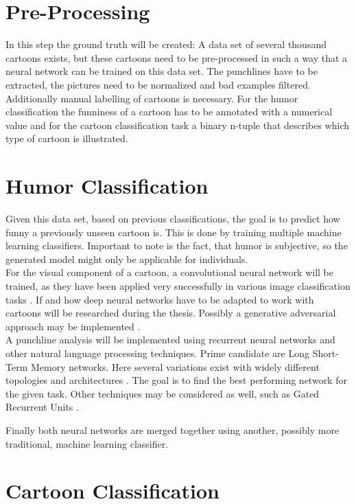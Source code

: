 \documentclass[draft,final,oneside]{vutinfth} %
\begin{document}
\section {Pre-Processing}
In this step the ground truth will be created: A data set of several thousand cartoons exists, but these cartoons need to be pre-processed in such a way that a neural network can be trained on this data set. The punchlines have to be extracted, the pictures need to be normalized and bad examples filtered. Additionally manual labelling of cartoons is necessary. For the humor classification the funniness of a cartoon has to be annotated with a numerical value and for the cartoon classification task a binary n-tuple that describes which type of cartoon is illustrated. \\

\section {Humor Classification}
Given this data set, based on previous classifications, the goal is to predict how funny a previously unseen cartoon is. This is done by training multiple machine learning classifiers. Important to note is the fact, that humor is subjective, so the generated model might only be applicable for individuals. \\

For the visual component of a cartoon, a convolutional neural network will be trained, as they have been applied very successfully in various image classification tasks \cite{dogsvscats}. If and how deep neural networks have to be adapted to work with cartoons will be researched during the thesis. Possibly a generative adversarial approach may be implemented  \cite{gan2}\cite{gan}.  \\

A punchline analysis will be implemented using recurrent neural networks and other natural language processing techniques. Prime candidate are Long Short-Term Memory networks. Here several variations exist with widely different topologies and architectures \cite{lstmvariants}. The goal is to find the best performing network for the given task. Other techniques may be considered as well, such as Gated Recurrent Units \cite{gru}.

Finally both neural networks are merged together using another, possibly more traditional, machine learning classifier. \\

\section {Cartoon Classification}
\end{document}
